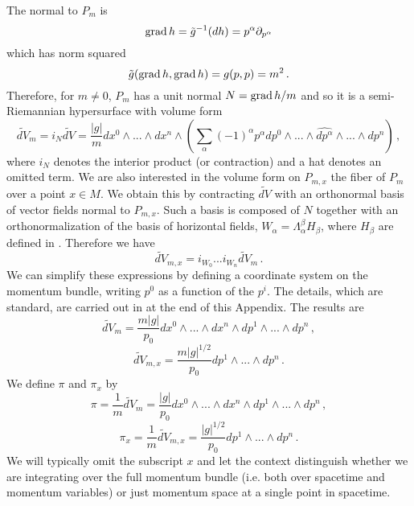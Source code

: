 The normal to $P_m$ is 
\begin{equation}
\operatorname{grad} h=\tilde{g}^{-1}(dh)=p^\alpha\partial_{p^\alpha}
\end{equation}
which has norm squared 
\begin{equation}
\tilde{g}(\operatorname{grad} h,\operatorname{grad} h)=g(p,p)=m^2\,.
\end{equation}
Therefore, for $m\neq 0$, $P_m$ has a unit normal $N=\operatorname{grad} h/m$ and so it is a semi-Riemannian hypersurface with volume form
\begin{equation}
\widetilde{dV}_m=i_N \widetilde{dV}=\frac{|g|}{m}dx^0\wedge...\wedge dx^n\wedge\left(\sum_\alpha (-1)^\alpha p^\alpha dp^0\wedge...\wedge\widehat{dp^\alpha}\wedge...\wedge dp^n\right)\,,
\end{equation}
where $i_N$ denotes the interior product (or contraction) and a hat denotes an omitted term. We are also interested in the volume form on $P_{m,x}$ the fiber of $P_m$ over a point $x\in M$. We obtain this by contracting $\widetilde{dV}$ with an orthonormal basis of vector fields normal to $P_{m,x}$. Such a basis is composed of $N$ together with an orthonormalization of the basis of horizontal fields, $W_\alpha=\Lambda^\beta_\alpha H_\beta$, where $H_\beta$ are defined in . Therefore we have
\begin{equation}
\widetilde{dV}_{m,x}=i_{W_0}...i_{W_n}\widetilde{dV}_m\,.
\end{equation}
 We can simplify these expressions by defining a coordinate system on the momentum bundle, writing $p^0$ as a function of the $p^i$. The details, which are standard, are carried out in %
 at the end of this Appendix. The results are
\begin{equation}
\widetilde{dV}_m=\frac{m|g|}{p_0}dx^0\wedge...\wedge dx^n\wedge dp^1\wedge...\wedge dp^n\,,
\end{equation}
\begin{equation}
\widetilde{dV}_{m,x}=\frac{m|g|^{1/2}}{p_0}dp^1\wedge...\wedge dp^n\,.
\end{equation}
We define $\pi$ and $\pi_x$ by
\begin{equation}
\pi=\frac{1}{m}\widetilde{dV}_m=\frac{|g|}{p_0}dx^0\wedge...\wedge dx^n\wedge dp^1\wedge...\wedge dp^n\,,
\end{equation}
\begin{equation}\label{pi:x}
\pi_x=\frac{1}{m}\widetilde{dV}_{m,x}=\frac{|g|^{1/2}}{p_0}dp^1\wedge...\wedge dp^n\,.
\end{equation}
We will typically omit the subscript $x$ and let the context distinguish whether we are integrating over the full momentum bundle (i.e. both over spacetime and momentum variables) or just momentum space at a single point in spacetime. \\

